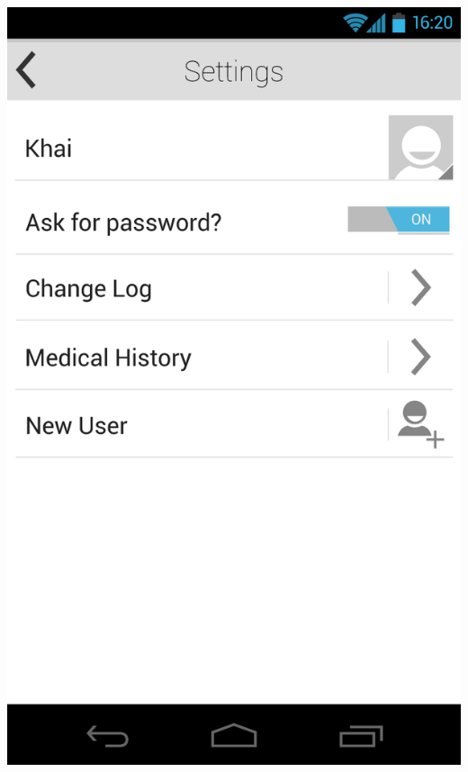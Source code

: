 \documentclass[pdftex,12pt,a4paper]{report}
\begin{document}
\includegraphics[scale=0.18]{Screens/04-Settings--Null.png}
\end{document}
